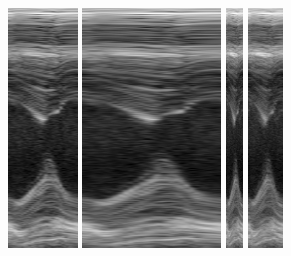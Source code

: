 \documentclass[journal]{IEEEtran}
\begin{document}
\begin{figure}[t]
\hspace{0.02cm}
\includegraphics[height=2.5in]{figures/decoded/2015-07-27-10-36-06_2015-07-15-16-56-16_1.raw.bmode/Input_Mag_4_kernel_regression_phase_sim.png}
\hspace{0.02cm}
\includegraphics[height=2.5in]
{figures/decoded/2015-07-27-10-36-06_2015-07-15-16-56-16_1.raw.bmode/Input_Mag_8_kernel_regression_phase_sim.png}
\hspace{1.0cm}
\includegraphics[height=2.5in]{figures/decoded/2015-07-27-10-36-06_2015-07-15-16-56-16_1.raw.bmode/Input_Mag_1_kernel_regression_phase.png}
\hspace{0.02cm}
\includegraphics[height=2.5in]{figures/decoded/2015-07-27-10-36-06_2015-07-15-16-56-16_1.raw.bmode/Input_Mag_2_kernel_regression_phase.png}

\end{figure}
\end{document}
